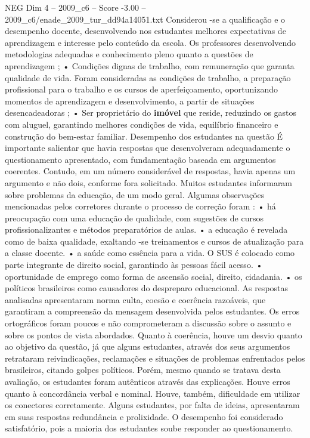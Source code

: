 \begin{textsample}{NEG Dim 4 – 2009\_c6 – Score -3.00 – 2009\_c6/enade\_2009\_tur\_dd94a14051.txt}
Considerou -se a qualificação e o desempenho docente, desenvolvendo nos estudantes melhores expectativas de aprendizagem e interesse pelo conteúdo da escola.
Os professores desenvolvendo metodologias adequadas e conhecimento pleno quanto a questões de aprendizagem ; • Condições dignas de trabalho, com remuneração que garanta qualidade de vida.
Foram consideradas as condições de trabalho, a preparação profissional para o trabalho e os cursos de aperfeiçoamento, oportunizando momentos de aprendizagem e desenvolvimento, a partir de situações desencadeadoras ; • Ser proprietário do \textbf{imóvel} que reside, reduzindo os gastos com aluguel, garantindo melhores condições de vida, equilíbrio financeiro e construção do bem-estar familiar.
Desempenho dos estudantes na questão É importante salientar que havia respostas que desenvolveram adequadamente o questionamento apresentado, com fundamentação baseada em argumentos coerentes.
Contudo, em um número considerável de respostas, havia apenas um argumento e não dois, conforme fora solicitado.
Muitos estudantes informaram sobre problemas da educação, de um modo geral.
Algumas observações mencionadas pelos corretores durante o processo de correção foram : • há preocupação com uma educação de qualidade, com sugestões de cursos profissionalizantes e métodos preparatórios de aulas. • a educação é revelada como de baixa qualidade, exaltando -se treinamentos e cursos de atualização para a classe docente. • a saúde como essência para a vida.
O SUS é colocado como parte integrante de direito social, garantindo às pessoas fácil acesso. • oportunidade de emprego como forma de ascensão social, direito, cidadania. • os políticos brasileiros como causadores do despreparo educacional.
As respostas analisadas apresentaram norma culta, coesão e coerência razoáveis, que garantiram a compreensão da mensagem desenvolvida pelos estudantes.
Os erros ortográficos foram poucos e não comprometeram a discussão sobre o assunto e sobre os pontos de vista abordados.
Quanto à coerência, houve um desvio quanto ao objetivo da questão, já que alguns estudantes, através dos seus argumentos retrataram reivindicações, reclamações e situações de problemas enfrentados pelos brasileiros, citando golpes políticos.
Porém, mesmo quando se tratava desta avaliação, os estudantes foram autênticos através das explicações.
Houve erros quanto à concordância verbal e nominal.
Houve, também, dificuldade em utilizar os conectores corretamente.
Alguns estudantes, por falta de ideias, apresentaram em suas respostas redundância e prolixidade.
O desempenho foi considerado satisfatório, pois a maioria dos estudantes soube responder ao questionamento.

\end{textsample}
